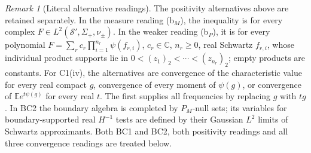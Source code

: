 \documentclass[11pt]{article}
\theoremstyle{plain}
\theoremstyle{definition}
\theoremstyle{remark}
\newtheorem{remark}[theorem]{Remark}
\newcommand{\C}{\mathbb{C}}
\newcommand{\E}{\mathbb{E}}
\newcommand{\cS}{\mathcal{S}}
\begin{document}
\begin{remark}[Literal alternative readings]\label{rem:C1-readings}
The positivity alternatives above are retained separately. In the measure
reading (b$_M$), the inequality is for every complex
$F\in L^2(\cS',\Sigma_+,\nu_\pm)$. In the weaker reading (b$_P$), it is
for every polynomial $F=\sum_r c_r\prod_{i=1}^{n_r}\psi(f_{r,i})$,
$c_r\in\C$, $n_r\ge0$, real Schwartz $f_{r,i}$, whose individual product
supports lie in $0<(z_1)_2<\cdots<(z_{n_r})_2$; empty products are constants.
For C1(iv), the alternatives are convergence of the characteristic value
for every real compact $g$, convergence of every moment of $\psi(g)$, or
convergence of $\E e^{t\psi(g)}$ for every real $t$. The first supplies all
frequencies by replacing $g$ with $tg$. In BC2 the boundary algebra is
completed by $P_M$-null sets; its variables for boundary-supported real
$H^{-1}$ tests are defined by their Gaussian $L^2$ limits of Schwartz
approximants. Both BC1 and BC2, both positivity readings and all three
convergence readings are treated below.
\end{remark}
\end{document}
